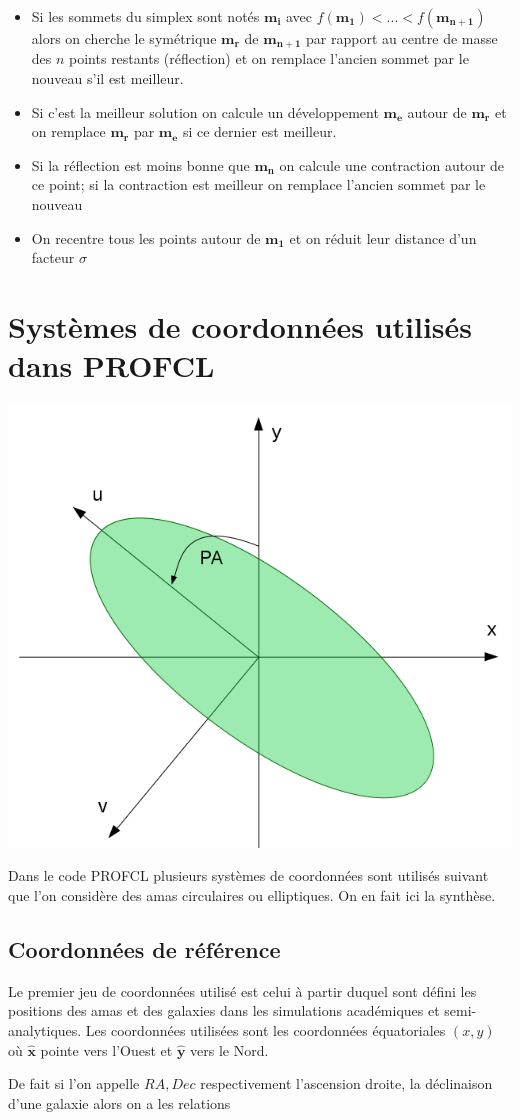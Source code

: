 \documentclass[a4paper,11pt]{article}
\numberwithin{equation}{section}
\begin{document}
    \begin{itemize}
      \item Si les sommets du simplex sont notés $\bm{m_i}$ avec $f(\bm{m_1}) < ... < f(\bm{m_{n+1}})$ alors on cherche le symétrique $\bm{m_r}$ de $\bm{m_{n+1}}$ par rapport au centre de masse des $n$ points restants (réflection) et on remplace l'ancien sommet par le nouveau s'il est meilleur.
      \item Si c'est la meilleur solution on calcule un développement $\bm{m_e}$ autour de $\bm{m_r}$ et on remplace $\bm{m_r}$ par $\bm{m_e}$ si ce dernier est meilleur.
      \item Si la réflection est moins bonne que $\bm{m_n}$ on calcule une contraction autour de ce point; si la contraction est meilleur on remplace l'ancien sommet par le nouveau
      \item On recentre tous les points autour de $\bm{m_1}$ et on réduit leur distance d'un facteur $\sigma$
    \end{itemize}
       
    
    
    
\newpage
\section{Systèmes de coordonnées utilisés dans PROFCL}
\label{coord}

  \begin{center}
    \includegraphics[width=0.5\linewidth]{coord.png}
  \end{center}
  
	Dans le code PROFCL plusieurs systèmes de coordonnées sont utilisés suivant que l'on considère des amas circulaires ou elliptiques. On en fait ici la synthèse.
    \subsection{Coordonnées de référence}
    		Le premier jeu de coordonnées utilisé est celui à partir duquel sont défini les positions des amas et des galaxies dans les simulations académiques et semi-analytiques. Les coordonnées utilisées sont les coordonnées équatoriales $(x, y)$ où $\bm{\hat{x}}$ pointe vers l'Ouest et $\bm{\hat{y}}$ vers le Nord.\par
    		De fait si l'on appelle $RA, Dec$ respectivement l'ascension droite, la déclinaison d'une galaxie alors on a les relations
    		
\end{document}
